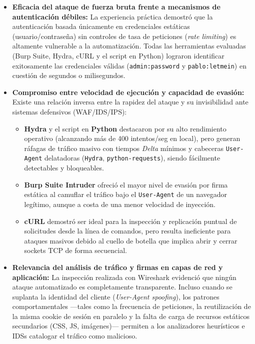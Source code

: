 \documentclass[letter,12pt]{article}
\begin{document}
\begin{itemize}
    \item \textbf{Eficacia del ataque de fuerza bruta frente a mecanismos de autenticación débiles:} 
    La experiencia práctica demostró que la autenticación basada únicamente en credenciales estáticas (usuario/contraseña) sin controles de tasa de peticiones (\textit{rate limiting}) es altamente vulnerable a la automatización. Todas las herramientas evaluadas (Burp Suite, Hydra, cURL y el script en Python) lograron identificar exitosamente las credenciales válidas (\texttt{admin:password} y \texttt{pablo:letmein}) en cuestión de segundos o milisegundos.

    \item \textbf{Compromiso entre velocidad de ejecución y capacidad de evasión:} 
    Existe una relación inversa entre la rapidez del ataque y su invisibilidad ante sistemas defensivos (WAF/IDS/IPS):
    \begin{itemize}
        \item \textbf{Hydra} y el script en \textbf{Python} destacaron por su alto rendimiento operativo (alcanzando más de 400 intentos/seg en local), pero generan ráfagas de tráfico masivo con tiempos \textit{Delta} mínimos y cabeceras \texttt{User-Agent} delatadoras (\texttt{Hydra}, \texttt{python-requests}), siendo fácilmente detectables y bloqueables.
        \item \textbf{Burp Suite Intruder} ofreció el mayor nivel de evasión por firma estática al camuflar el tráfico bajo el \texttt{User-Agent} de un navegador legítimo, aunque a costa de una menor velocidad de inyección.
        \item \textbf{cURL} demostró ser ideal para la inspección y replicación puntual de solicitudes desde la línea de comandos, pero resulta ineficiente para ataques masivos debido al cuello de botella que implica abrir y cerrar sockets TCP de forma secuencial.
    \end{itemize}

    \item \textbf{Relevancia del análisis de tráfico y firmas en capas de red y aplicación:} 
    La inspección realizada con Wireshark evidenció que ningún ataque automatizado es completamente transparente. Incluso cuando se suplanta la identidad del cliente (\textit{User-Agent spoofing}), los patrones comportamentales —tales como la frecuencia de peticiones, la reutilización de la misma cookie de sesión en paralelo y la falta de carga de recursos estáticos secundarios (CSS, JS, imágenes)— permiten a los analizadores heurísticos e IDSs catalogar el tráfico como malicioso.


\end{itemize}
\end{document}
